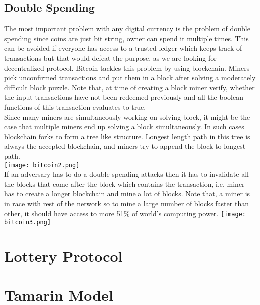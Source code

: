 \documentclass[a4paper]{article}
\begin{document}
\subsection{Double Spending}
The most important problem with any digital currency is the problem of double spending since coins are just bit string, owner can spend it multiple times. This can be avoided if everyone has access to a trusted ledger which keeps track of transactions but that would defeat the purpose, as we are looking for decentralized protocol. Bitcoin tackles this problem by using blockchain. Miners pick unconfirmed transactions and put them in a block after solving a moderately difficult block puzzle. Note that, at time of creating a block miner verify, whether the input transactions have not been redeemed previously and all the boolean functions of this transaction evaluates to true.\\
Since many miners are simultaneously working on solving block, it might be the case that multiple miners end up solving a block simultaneously. In such cases blockchain forks to form a tree like structure. Longest length path in this tree is always the accepted blockchain, and miners try to append the block to longest path.\\
\texttt{[image: bitcoin2.png]}
\\If an adversary has to do a double spending attacks then it has to invalidate all the blocks that come after the block which contains the transaction, i.e. miner has to create a longer blockchain and mine a lot of blocks. Note that, a miner is in race with rest of the network so to mine a large number of blocks faster than other, it should have access to more 51\% of world's computing power. 
\texttt{[image: bitcoin3.png]}
\section{Lottery Protocol}
\section{Tamarin Model}
\end{document}
